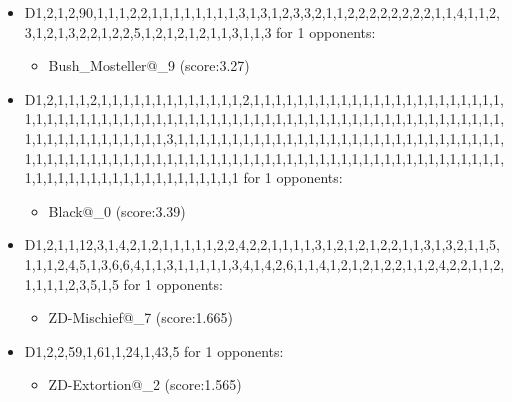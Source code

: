 \begin{appendices}
\begin{itemize}
        \item D1,2,1,2,90,1,1,1,2,2,1,1,1,1,1,1,1,1,3,1,3,1,2,3,3,2,1,1,2,2,2,2,2,2,2,2,1,1,4,1,1,2,3,1,2,1,3,2,2,1,2,2,5,1,2,1,2,1,2,1,1,3,1,1,3 for 1 opponents:
        \begin{multicols}{3}
            \begin{itemize}
                \item Bush\_Mosteller@\_9 (score:3.27)
            \end{itemize}
        \end{multicols}

        \item D1,2,1,1,1,2,1,1,1,1,1,1,1,1,1,1,1,1,1,2,1,1,1,1,1,1,1,1,1,1,1,1,1,1,1,1,1,1,1,1,1,1,1,1,1,1,1,1,1,1,1,1,1,1,1,1,1,1,1,1,1,1,1,1,1,1,1,1,1,1,1,1,1,1,1,1,1,1,1,1,1,1,1,1,1,1,1,1,1,1,1,1,1,1,1,1,1,1,1,1,3,1,1,1,1,1,1,1,1,1,1,1,1,1,1,1,1,1,1,1,1,1,1,1,1,1,1,1,1,1,1,1,1,1,1,1,1,1,1,1,1,1,1,1,1,1,1,1,1,1,1,1,1,1,1,1,1,1,1,1,1,1,1,1,1,1,1,1,1,1,1,1,1,1,1,1,1,1,1,1,1,1,1,1,1,1,1,1,1,1,1,1,1,1,1 for 1 opponents:
        \begin{multicols}{3}
            \begin{itemize}
                \item Black@\_0 (score:3.39)
            \end{itemize}
        \end{multicols}

        \item D1,2,1,1,12,3,1,4,2,1,2,1,1,1,1,1,2,2,4,2,2,1,1,1,1,3,1,2,1,2,1,2,2,1,1,3,1,3,2,1,1,5,1,1,1,2,4,5,1,3,6,6,4,1,1,3,1,1,1,1,1,3,4,1,4,2,6,1,1,4,1,2,1,2,1,2,2,1,1,2,4,2,2,1,1,2,1,1,1,1,2,3,5,1,5 for 1 opponents:
        \begin{multicols}{3}
            \begin{itemize}
                \item ZD-Mischief@\_7 (score:1.665)
            \end{itemize}
        \end{multicols}

        \item D1,2,2,59,1,61,1,24,1,43,5 for 1 opponents:
        \begin{multicols}{3}
            \begin{itemize}
                \item ZD-Extortion@\_2 (score:1.565)
            \end{itemize}
        \end{multicols}


\end{itemize}
\end{appendices}
